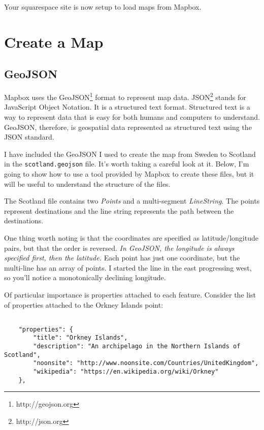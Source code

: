 \documentclass[11pt]{article}
\begin{document}
Your squarespace site is now setup to load maps from Mapbox.

\section{Create a Map}

\subsection{GeoJSON}

Mapbox uses the GeoJSON\footnote{http://geojson.org} format to
represent map data. JSON\footnote{http://json.org} stands for
JavaScript Object Notation. It is a structured text format. Structured
text is a way to represent data that is easy for both humans and
computers to understand. GeoJSON, therefore, is geospatial data
represented as structured text using the JSON standard.

I have included the GeoJSON I used to create the map from Sweden to
Scotland in the \texttt{scotland.geojson} file. It's worth taking a
careful look at it. Below, I'm going to show how to use a tool
provided by Mapbox to create these files, but it will be useful to
understand the structure of the files.

The Scotland file contains two \emph{Points} and a multi-segment
\emph{LineString}. The points represent destinations and the line
string represents the path between the destinations.

One thing worth noting is that the coordinates are specified as
latitude/longitude pairs, but that the order is reversed. \emph{In
  GeoJSON, the longitude is always specified first, then the
  latitude.} Each point has just one coordinate, but the multi-line
has an array of points. I started the line in the east progressing
west, so you'll notice a monotonically declining longitude.

Of particular importance is properties attached to each
feature. Consider the list of properties attached to the Orkney
Islands point:

\begin{verbatim}

    "properties": {
        "title": "Orkney Islands",
        "description": "An archipelago in the Northern Islands of Scotland",
        "noonsite": "http://www.noonsite.com/Countries/UnitedKingdom",
        "wikipedia": "https://en.wikipedia.org/wiki/Orkney"
    },
\end{verbatim}
\end{document}
